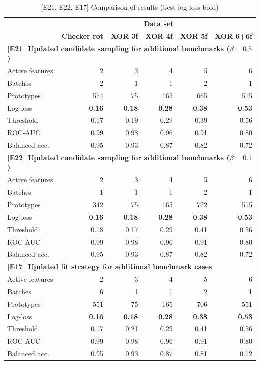 \begin{table}
\caption{[E21, E22, E17] Comparison of results (best log-loss bold)}
\label{tab_e21_e22_e17}
%
\begin{center}
\small
\begin{tabular}{|lrrrrr|}
\hline
&\multicolumn{5}{c|}{\textbf{\hrulefill\ Data set \hrulefill}}\\
&\textbf{Checker rot}&\textbf{XOR 3f}&\textbf{XOR 4f}&\textbf{XOR 5f}&\textbf{XOR 6+6f}\\
\multicolumn{6}{|l|}{\textbf{[E21] Updated candidate sampling for additional benchmarks ($\beta=0.5$)}}\\
Active features&2&3&4&5&6\\
Batches&2&1&1&2&1\\
Prototypes&574&75&165&665&515\\
Log-loss&\textbf{0.16}&\textbf{0.18}&\textbf{0.28}&\textbf{0.38}&\textbf{0.53}\\
Threshold&0.17&0.19&0.29&0.39&0.56\\
ROC-AUC&0.99&0.98&0.96&0.91&0.80\\
Balanced acc.&0.95&0.93&0.87&0.82&0.72\\
\multicolumn{6}{|l|}{\textbf{[E22] Updated candidate sampling for additional benchmarks ($\beta=0.1$)}}\\
Active features&2&3&4&5&6\\
Batches&1&1&1&2&1\\
Prototypes&342&75&165&722&515\\
Log-loss&\textbf{0.16}&\textbf{0.18}&\textbf{0.28}&\textbf{0.38}&\textbf{0.53}\\
Threshold&0.18&0.17&0.29&0.41&0.56\\
ROC-AUC&0.99&0.98&0.96&0.91&0.80\\
Balanced acc.&0.95&0.93&0.87&0.82&0.72\\
\multicolumn{6}{|l|}{\textbf{[E17] Updated fit strategy for additional benchmark cases}}\\
Active features&2&3&4&5&6\\
Batches&6&1&1&2&1\\
Prototypes&551&75&165&706&551\\
Log-loss&\textbf{0.16}&\textbf{0.18}&\textbf{0.28}&\textbf{0.38}&\textbf{0.53}\\
Threshold&0.17&0.21&0.29&0.41&0.56\\
ROC-AUC&0.99&0.98&0.96&0.91&0.80\\
Balanced acc.&0.95&0.93&0.87&0.81&0.72\\
\hline
\end{tabular}
\end{center}
\end{table}
